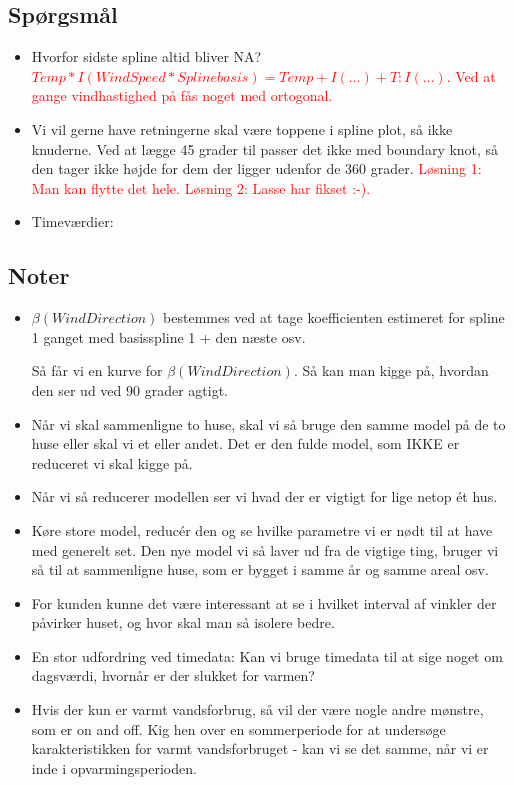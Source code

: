 \subsection{Spørgsmål}
\begin{itemize}
    \item Hvorfor sidste spline altid bliver NA? \textcolor{red}{$Temp * I(WindSpeed*Splinebasis) = Temp + I(\dots) + T:I(\dots)$. Ved at gange vindhastighed på fås noget med ortogonal.} 
    \item Vi vil gerne have retningerne skal være toppene i spline plot, så ikke knuderne. Ved at lægge 45 grader til passer det ikke med boundary knot, så den tager ikke højde for dem der ligger udenfor de 360 grader. \textcolor{red}{Løsning 1: Man kan flytte det hele. Løsning 2: Lasse har fikset :-).}
    \item Timeværdier: 
\end{itemize}

\subsection{Noter}
\begin{itemize}
    \item $\beta(WindDirection)$ bestemmes ved at tage koefficienten estimeret for spline 1 ganget med basisspline 1 + den næste osv. 
    
    \noindent Så får vi en kurve for $\beta(WindDirection)$. Så kan man kigge på, hvordan den ser ud ved 90 grader agtigt.
    \item Når vi skal sammenligne to huse, skal vi så bruge den samme model på de to huse eller skal vi et eller andet. Det er den fulde model, som IKKE er reduceret vi skal kigge på.
    \item Når vi så reducerer modellen ser vi hvad der er vigtigt for lige netop ét hus. 
    \item Køre store model, reducér den og se hvilke parametre vi er nødt til at have med generelt set. Den nye model vi så laver ud fra de vigtige ting, bruger vi så til at sammenligne huse, som er bygget i samme år og samme areal osv.
    \item For kunden kunne det være interessant at se i hvilket interval af vinkler der påvirker huset, og hvor skal man så isolere bedre. 
    \item En stor udfordring ved timedata: Kan vi bruge timedata til at sige noget om dagsværdi, hvornår er der slukket for varmen? 
    \item Hvis der kun er varmt vandsforbrug, så vil der være nogle andre mønstre, som er on and off. Kig hen over en sommerperiode for at undersøge karakteristikken for varmt vandsforbruget - kan vi se det samme, når vi er inde i opvarmingsperioden. 
\end{itemize}

